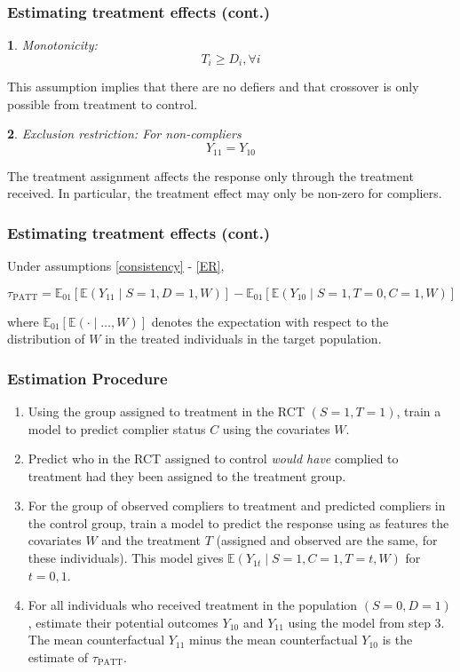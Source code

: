 \documentclass{beamer}
\makeatletter
\newtheorem*{assumption*}{\assumptionnumber}
\providecommand{\assumptionnumber}{}
\newenvironment{assumption}[2]
 {%
  \renewcommand{\assumptionnumber}{Assumption #1}%
  \begin{assumption*}%
  \protected@edef\@currentlabel{#1}%
 }
 {%
  \end{assumption*}
 }
\newcommand{\ex}{\mathbb{E}} %
\makeatother
\begin{document}
\begin{frame}
\frametitle{Estimating treatment effects (cont.)}
\begin{assumption}{6}{}\label{monotonicity}
Monotonicity: 
\begin{equation*}
T_i \geq D_i, \forall i
\end{equation*}
\end{assumption}
\noindent This assumption implies that there are no defiers and that crossover is only possible from treatment to control.
\begin{assumption}{7}{}\label{ER}
Exclusion restriction: For non-compliers
\begin{equation*}
Y_{11} = Y_{10}
\end{equation*}  
\end{assumption}
\noindent The treatment assignment affects the response only through the treatment received.  In particular, the treatment effect may only be non-zero for compliers.  
\end{frame}



\begin{frame}
\frametitle{Estimating treatment effects (cont.)}
\begin{theorem}\label{thm1}
Under assumptions \eqref{consistency} - \eqref{ER},

$$\tau_{\text{PATT}} = \ex_{01}\left[  \ex\left(Y_{11} \mid S=1, D=1, W\right)\right]
-\ex_{01}\left[  \ex\left(Y_{10} \mid S=1, T=0, C=1, W\right) \right] $$

where $\ex_{01}\left[\ex(\cdot \mid\dots, W)\right]$ denotes the expectation with respect to the distribution of $W$ in the treated individuals in the target population.  
\end{theorem}
\end{frame}

\begin{frame} %
\frametitle{Estimation Procedure}
\begin{enumerate}
\item Using the group assigned to treatment in the RCT $(S=1, T=1)$, train a model to predict complier status $C$ using the covariates $W$.
\item Predict who in the RCT assigned to control \textit{would have} complied to treatment had they been assigned to the treatment group.
\item For the group of observed compliers to treatment and predicted compliers in the control group, train a model to predict the response using as features the covariates $W$ and the treatment $T$ (assigned and observed are the same, for these individuals).  This model gives $\ex(Y_{1t} \mid S=1, C=1, T=t, W)$ for $t = 0,1$.
\item For all individuals who received treatment in the population $(S=0, D=1)$, estimate their potential outcomes $Y_{10}$ and $Y_{11}$ using the model from step 3.  The mean counterfactual $Y_{11}$ minus the mean counterfactual $Y_{10}$ is the estimate of $\tau_{\text{PATT}}$.
\end{enumerate}
\end{frame}
\end{document}
